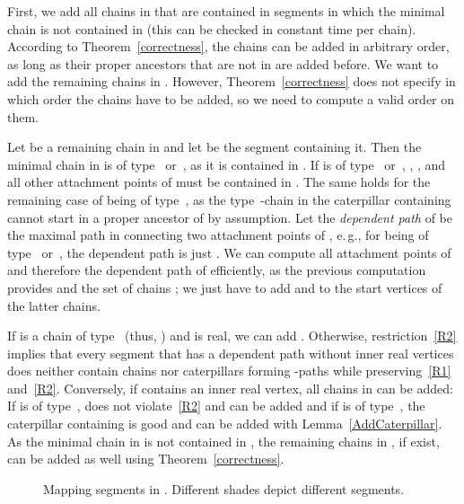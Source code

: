 First, we add all chains in  that are contained in segments in which the minimal chain is not contained in  (this can be checked in constant time per chain). According to Theorem~\ref{correctness}, the chains can be added in arbitrary order, as long as their proper ancestors that are not in  are added before. We want to add the remaining chains in . However, Theorem~\ref{correctness} does not specify in which order the chains have to be added, so we need to compute a valid order on them.

Let  be a remaining chain in  and let  be the segment containing it. Then the minimal chain  in  is of type~ or~, as it is contained in . If  is of type~ or~, , ,  and all other attachment points of  must be contained in . The same holds for the remaining case of  being of type~, as the type~-chain in the caterpillar containing  cannot start in a proper ancestor of  by assumption. Let the \emph{dependent path} of  be the maximal path in  connecting two attachment points of , e.\,g., for  being of type~ or~, the dependent path is just . We can compute all attachment points of  and therefore the dependent path of  efficiently, as the previous computation provides  and the set of chains ; we just have to add  and  to the start vertices of the latter chains.

If  is a chain of type~ (thus, ) and  is real, we can add . Otherwise, restriction~\ref{R2} implies that every segment  that has a dependent path  without inner real vertices does neither contain chains nor caterpillars forming \BG-paths while preserving~\ref{R1} and~\ref{R2}. Conversely, if  contains an inner real vertex, all chains in  can be added: If  is of type~,  does not violate~\ref{R2} and can be added and if  is of type~, the caterpillar containing  is good and can be added with Lemma~\ref{AddCaterpillar}. As the minimal chain in  is not contained in , the remaining chains in , if exist, can be added as well using Theorem~\ref{correctness}.

\begin{wrapfigure}[16]{R}{7cm}
	\vspace{-0.5cm}
	\centering
\hspace{0.1cm}
	\caption{Mapping segments in . Different shades depict different segments.}
	\label{fig:Mapping}
\end{wrapfigure}

